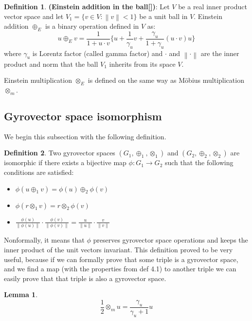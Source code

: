 \documentclass[a4paper]{article}
\theoremstyle{definition}
\newtheorem{definition}{Definition}[section]
\newtheorem{lemma}[theorem]{Lemma}
\newcommand{\norm}[1]{\left\lVert#1\right\rVert}
\begin{document}
\begin{definition}\textbf{(Einstein addition in the ball[])}: Let $V$ be a real inner product vector space and let $V_1 = \{v\in V: \norm{v}<1\}$ be a unit ball in $V$. Einstein addition $\oplus_E$ is a binary operation defined in $V$ as:
$$u \oplus_E v = \frac{1}{1+u\cdot v}\Big\{u+\frac{1}{\gamma_u}v+\frac{\gamma_u}{1+\gamma_u}(u\cdot v)u\Big\}$$ 
where $\gamma_u$ is Lorentz factor (called gamma factor) and $\cdot$ and $\norm{\cdot}$ are the inner product and norm that the ball $V_1$ inherits from its space $V$. 
\end{definition}

Einstein multiplication $\otimes_E$ is defined on the same way as M\" obius multiplication $\otimes_m$.

\subsection{Gyrovector space isomorphism}
We begin this subsection with the following definition.

\begin{definition} Two gyrovector spaces $(G_1, \oplus_1, \otimes_1)$ and $(G_2, \oplus_2, \otimes_2)$  are isomorphic if there exists a bijective map $\phi: G_1 \rightarrow G_2$ such that the following conditions are satisfied:
\begin{itemize}
    \item $\phi(u\oplus_1 v) = \phi(u)\oplus_2 \phi(v)$
    \item $\phi(r\otimes_1 v) = r\otimes_2 \phi(v)$
    \item $\frac{\phi(u)}{\parallel \phi(u) \parallel}\cdot \frac{\phi(v)}{\parallel \phi(v)\parallel} = \frac{u}{\parallel u \parallel}\cdot \frac{v}{\parallel v \parallel}$
\end{itemize}
\end{definition}
Nonformally, it means that $\phi$ preserves gyrovector space operations and keeps the inner product of the unit vectors invariant.
This definition proved to be very useful, because if we can formally prove that some triple is a gyrovector space, and we find a map (with the properties from def 4.1) to another triple we can easily prove that that triple is also a gyrovector space. 

\begin{lemma}$$\frac{1}{2}\otimes_m u = \frac{\gamma_u}{\gamma_u + 1} u$$
\end{lemma}
\end{document}

